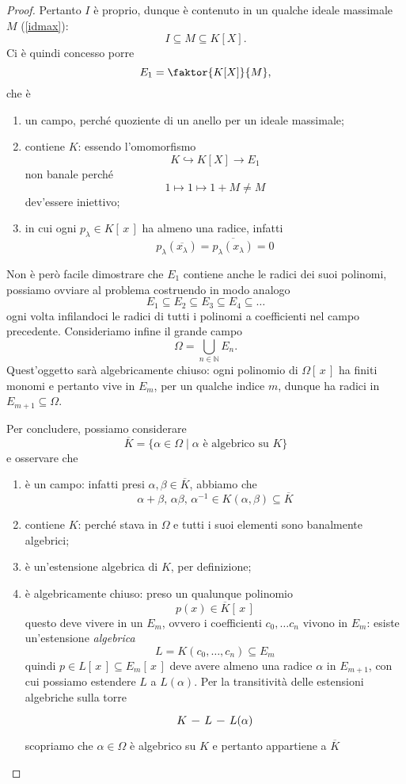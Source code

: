 \begin{multicols}{2}
\begin{proof}
	Pertanto $ I $ è proprio, dunque è contenuto in un qualche ideale massimale $ M $ (\ref{idmax}):
	\[ I \subseteq M \subseteq K[X]. \]
	Ci è quindi concesso porre
	\[ E_1 = \faktor{K[X]}{M}, \]
	che è
	\begin{enumerate}
		\item un campo, perché quoziente di un anello per un ideale massimale;
		\item contiene $ K $: essendo l'omomorfismo
		\[ K \hookrightarrow K[X] \to E_1 \]
		non banale perché
		\[ 1 \mapsto 1 \mapsto 1 + M \neq M \]
		dev'essere iniettivo;
		\item in cui ogni $ p_\lambda \in K[\,x\,] $ ha almeno una radice, infatti
		\[ p_\lambda(\overline{x_\lambda}) = \overline{p_\lambda(x_\lambda)} = 0 \]
	\end{enumerate}
	
	Non è però facile dimostrare che $ E_1 $ contiene anche le radici dei suoi polinomi, possiamo ovviare al problema costruendo in modo analogo $$ E_1 \subseteq E_2 \subseteq E_3 \subseteq E_4 \subseteq \dots  $$
	ogni volta infilandoci le radici di tutti i polinomi a coefficienti nel campo precedente. Consideriamo infine il grande campo
	\[ \Omega = \bigcup_{n \in \mathbb{N}} E_n. \]
	Quest'oggetto sarà algebricamente chiuso: ogni polinomio di $ \Omega[\,x\,] $ ha finiti monomi e pertanto vive in $ E_{m} $, per un qualche indice $ m $, dunque ha radici in $ E_{m+1} \subseteq \Omega $.
	
	Per concludere, possiamo considerare 
	\[ \boxed{\overline{K} = \{ \alpha \in \Omega \mid \alpha \text{ è algebrico su } K \}} \]
	e osservare che
	\begin{enumerate}
		\item è un campo: infatti presi $ \alpha, \beta \in \overline{K} $, abbiamo che
		\[ \alpha + \beta,\, \alpha\beta, \, \alpha^{-1} \in K(\alpha, \beta) \subseteq \overline{K} \]
		\item contiene $ K $: perché stava in $ \Omega $ e tutti i suoi elementi sono banalmente algebrici;
		\item è un'estensione algebrica di $ K $, per definizione;
		\item è algebricamente chiuso: preso un qualunque polinomio
		\[ p(x) \in \overline{K}[\, x \,] \]
		questo deve vivere in un $ E_m $, ovvero i coefficienti $ c_0, \dots c_n $ vivono in $ E_m $: esiste un'estensione \emph{algebrica}
		\[ L = K(c_0, \dots, c_n) \subseteq E_m  \]
		quindi $ p \in L[\,x\,] \subseteq E_m[\,x\,]  $ deve avere almeno una radice $ \alpha $ in $ E_{m+1} $, con cui possiamo estendere $ L $ a $ L(\alpha) $. Per la transitività delle estensioni algebriche sulla torre
		\[\begin{tikzcd}[column sep=0.25cm]
		K \arrow [r,-] &
		L \arrow [r,-] &
		L(\alpha)
		\end{tikzcd} \]
		scopriamo che $ \alpha \in \Omega $ è algebrico su $ K $ e pertanto appartiene a $ \overline{K} $
		

\end{enumerate}
\end{proof}
\end{multicols}
